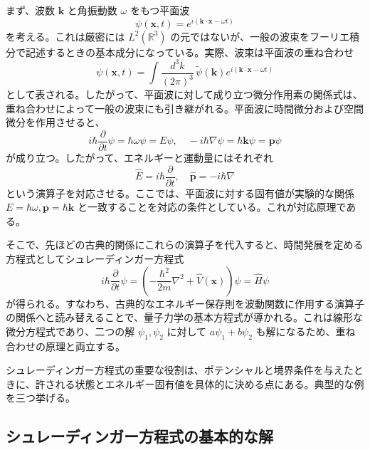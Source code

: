 まず、波数 $\mathbf{k}$ と角振動数 $\omega$ をもつ平面波
\[
\psi(\mathbf{x}, t) = e^{i(\mathbf{k} \cdot \mathbf{x} - \omega t)}
\]
を考える。これは厳密には $L^2(\mathbb{R}^3)$ の元ではないが、一般の波束をフーリエ積分で記述するときの基本成分になっている。実際、波束は平面波の重ね合わせ
\[
\psi(\mathbf{x},t)
=
\int \frac{d^3k}{(2\pi)^3}\,\tilde{\psi}(\mathbf{k})e^{i(\mathbf{k}\cdot \mathbf{x}-\omega t)}
\]
として表される。したがって、平面波に対して成り立つ微分作用素の関係式は、重ね合わせによって一般の波束にも引き継がれる。平面波に時間微分および空間微分を作用させると、
\begin{equation}
    i\hbar \frac{\partial}{\partial t} \psi = \hbar \omega \psi = E \psi, \quad -i\hbar \nabla \psi = \hbar \mathbf{k} \psi = \mathbf{p} \psi
\end{equation}
が成り立つ。したがって、エネルギーと運動量にはそれぞれ
\begin{equation}
    \hat{E} = i\hbar \frac{\partial}{\partial t}, \quad \hat{\mathbf{p}} = -i\hbar \nabla
\end{equation}
という演算子を対応させる。ここでは、平面波に対する固有値が実験的な関係 $E=\hbar\omega,\mathbf{p}=\hbar\mathbf{k}$ と一致することを対応の条件としている。これが対応原理である。

そこで、先ほどの古典的関係にこれらの演算子を代入すると、時間発展を定める方程式としてシュレーディンガー方程式
\begin{equation}
    i\hbar \frac{\partial}{\partial t} \psi = \left( -\frac{\hbar^2}{2m} \nabla^2 + \hat{V}(\mathbf{x}) \right) \psi = \hat{H} \psi
\end{equation}
が得られる。すなわち、古典的なエネルギー保存則を波動関数に作用する演算子の関係へと読み替えることで、量子力学の基本方程式が導かれる。これは線形な微分方程式であり、二つの解 $\psi_1,\psi_2$ に対して $a\psi_1+b\psi_2$ も解になるため、重ね合わせの原理と両立する。

シュレーディンガー方程式の重要な役割は、ポテンシャルと境界条件を与えたときに、許される状態とエネルギー固有値を具体的に決める点にある。典型的な例を三つ挙げる。
\subsection{シュレーディンガー方程式の基本的な解}
